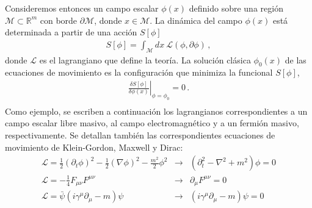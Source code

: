 Consideremos entonces un campo escalar $\phi(x)$ definido sobre una región $\mathcal{M}\subset \mathbb{R}^m$ con borde $\partial \mathcal{M}$, donde $x \in  \mathcal{M}$. La dinámica del campo $\phi(x)$ está determinada a partir de una acción $S[\phi]$
\begin{align}
		S[\phi]=\int_\mathcal{M} dx\ \mathscr L(\phi,\partial\phi)\,,
\end{align}
 donde $\mathscr L$ es el lagrangiano que define la teoría. La solución clásica $\phi _0(x)$ de las ecuaciones de movimiento es la configuración que minimiza la funcional $S[\phi]$,
\begin{equation}
\begin{array}{c}
\left. \frac{\delta S [ \phi ] }{\delta \phi (x)}  \right| _{\phi = \phi _0  } = 0 \, . \\[10pt]
\end{array}
\end{equation}
Como ejemplo, se escriben a continuación los lagrangianos correspondientes a un campo escalar libre masivo, al campo electromagnético y a un fermión masivo, respectivamente. Se detallan también las correspondientes ecuaciones de movimiento de Klein-Gordon, Maxwell y Dirac:
\begin{equation}
\begin{array}{lcl}
\mathscr{L} = \frac{1}{2} (\partial _t \phi ) ^2 - \frac{1}{2} (  \nabla \phi ) ^2 - 
	\frac{m^2}{2} \phi ^2 
&\rightarrow& 
\left(
	\partial _t ^2 - \nabla ^2 + m^2 
		\right) \phi = 0 \\[8pt]
		
\mathscr{L} = - \frac{1}{4} F _{\mu \nu} F ^{\mu \nu}
&\rightarrow&
 \partial _{\mu} F ^{\mu \nu} = 0 \\[8pt]

\mathscr{L} =  { \bar{\psi} } \left(
			i \gamma ^{\mu} \partial _{\mu} - m 
			\right) \psi 
&\rightarrow&
			\left( i  \gamma ^{\mu} \partial _{\mu}  - m \right)\psi = 0\\[10pt]
\end{array}
\label{campos}
\end{equation}


